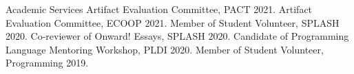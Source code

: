 \begin{rubric}{Academic Services}
  \entry*[2021] Artifact Evaluation Committee, PACT 2021.
  \entry*[2021] Artifact Evaluation Committee, ECOOP 2021.
  \entry*[2020] Member of Student Volunteer, SPLASH 2020.
  \entry*[2020] Co-reviewer of Onward! Essays, SPLASH 2020.
  \entry*[2020] Candidate of Programming Language Mentoring Workshop, PLDI 2020.
  \entry*[2019] Member of Student Volunteer, Programming 2019.
\end{rubric}
